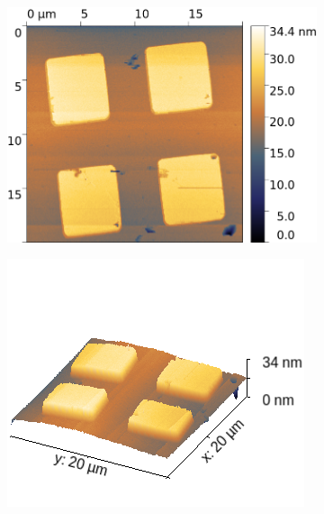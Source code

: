 \begin{figure}[H]
    \centering
    \begin{subfigure}{0.49\textwidth}
        \includegraphics[width=\textwidth]{bilder/Mikrostruktur/Quadrat_Vor_2D.png}
        \caption{}
    \end{subfigure}
    \begin{subfigure}{0.49\textwidth}
        \includegraphics[width=\textwidth]{bilder/Mikrostruktur/Quadrat_Vor_3D.png}
        \caption{}
    \end{subfigure}
    \begin{subfigure}{0.49\textwidth}

\end{subfigure}
\end{figure}
